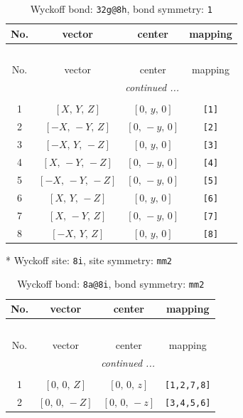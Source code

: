 \documentclass[fleqn,8pt]{jsarticle}
\begin{document}
\begin{longtable}{cccc}
\caption{Wyckoff bond: {\tt 32g@8h}, bond symmetry: {\tt 1}}
 \\
 \hline \hline
No. & vector & center & mapping \\ \hline \endfirsthead

\multicolumn{3}{l}{\tablename\ \thetable{}} \\
 \hline \hline
No. & vector & center & mapping \\ \hline \endhead

 \hline \hline
\multicolumn{3}{r}{\footnotesize\it continued ...} \\ \endfoot

 \hline \hline
\multicolumn{3}{r}{} \\ \endlastfoot

1 & $\left[ X,\, Y,\, Z \right]$ & $\left[ 0,\, y,\, 0 \right]$ & {\tt [1]} \\ \hline
2 & $\left[ - X,\, - Y,\, Z \right]$ & $\left[ 0,\, - y,\, 0 \right]$ & {\tt [2]} \\ \hline
3 & $\left[ - X,\, Y,\, - Z \right]$ & $\left[ 0,\, y,\, 0 \right]$ & {\tt [3]} \\ \hline
4 & $\left[ X,\, - Y,\, - Z \right]$ & $\left[ 0,\, - y,\, 0 \right]$ & {\tt [4]} \\ \hline
5 & $\left[ - X,\, - Y,\, - Z \right]$ & $\left[ 0,\, - y,\, 0 \right]$ & {\tt [5]} \\ \hline
6 & $\left[ X,\, Y,\, - Z \right]$ & $\left[ 0,\, y,\, 0 \right]$ & {\tt [6]} \\ \hline
7 & $\left[ X,\, - Y,\, Z \right]$ & $\left[ 0,\, - y,\, 0 \right]$ & {\tt [7]} \\ \hline
8 & $\left[ - X,\, Y,\, Z \right]$ & $\left[ 0,\, y,\, 0 \right]$ & {\tt [8]} \\
\end{longtable}
* Wyckoff site: {\tt 8i}, site symmetry: {\tt mm2}
\renewcommand{\arraystretch}{1.2}
\begin{longtable}{cccc}
\caption{Wyckoff bond: {\tt 8a@8i}, bond symmetry: {\tt mm2}}
 \\
 \hline \hline
No. & vector & center & mapping \\ \hline \endfirsthead

\multicolumn{3}{l}{\tablename\ \thetable{}} \\
 \hline \hline
No. & vector & center & mapping \\ \hline \endhead

 \hline \hline
\multicolumn{3}{r}{\footnotesize\it continued ...} \\ \endfoot

 \hline \hline
\multicolumn{3}{r}{} \\ \endlastfoot

1 & $\left[ 0,\, 0,\, Z \right]$ & $\left[ 0,\, 0,\, z \right]$ & {\tt [1,2,7,8]} \\ \hline
2 & $\left[ 0,\, 0,\, - Z \right]$ & $\left[ 0,\, 0,\, - z \right]$ & {\tt [3,4,5,6]} \\
\end{longtable}
\end{document}

